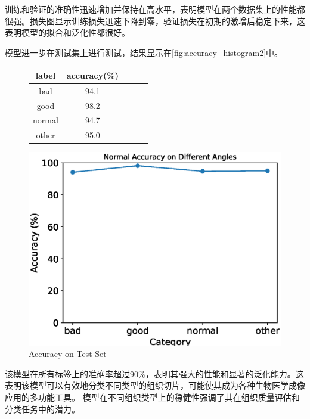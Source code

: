 训练和验证的准确性迅速增加并保持在高水平，表明模型在两个数据集上的性能都很强。损失图显示训练损失迅速下降到零，验证损失在初期的激增后稳定下来，这表明模型的拟合和泛化性都很好。

模型进一步在测试集上进行测试，结果显示在\autoref{fig:accuracy_histogram2}中。

\begin{figure}[H]
    \begin{minipage}{0.45\textwidth}
        \centering
        \begin{tabular}{ccccc}
            \toprule
            label & accuracy(\%) \\
            \midrule
            bad & 94.1 \\
            good & 98.2 \\
            normal & 94.7 \\
            other & 95.0 \\
            \bottomrule
        \end{tabular}
        \label{tab:model_accuracy3}
    \end{minipage}
    \begin{minipage}{0.45\textwidth}
        \centering
        \includegraphics[width=\textwidth]{./fig/assistplot/angle_accuracy2.eps}
        \caption{Accuracy on Test Set}
        \label{fig:accuracy_histogram2}
    \end{minipage}
\end{figure}

该模型在所有标签上的准确率超过90\%，表明其强大的性能和显著的泛化能力。这表明该模型可以有效地分类不同类型的组织切片，可能使其成为各种生物医学成像应用的多功能工具。 模型在不同组织类型上的稳健性强调了其在组织质量评估和分类任务中的潜力。

\FloatBarrier